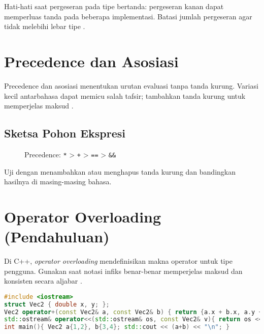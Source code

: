 \documentclass[../main.tex]{subfiles}
\begin{document}
Hati-hati saat pergeseran pada tipe bertanda: pergeseran kanan dapat memperluas tanda pada beberapa implementasi. Batasi jumlah pergeseran agar tidak melebihi lebar tipe \parencite{iso-c-draft-n1570,cpp-reference}.

\section{Precedence dan Asosiasi}
Precedence dan asosiasi menentukan urutan evaluasi tanpa tanda kurung. Variasi kecil antarbahasa dapat memicu salah tafsir; tambahkan tanda kurung untuk memperjelas maksud \parencite{gnu-c-manual,cpp-op-precedence,c-op-precedence}.

\subsection{Sketsa Pohon Ekspresi}
\begin{figure}[h]
  \centering
  \caption{Precedence: \texttt{*} > \texttt{+} > \texttt{==} > \texttt{&&}}
\end{figure}

Uji dengan menambahkan atau menghapus tanda kurung dan bandingkan hasilnya di masing-masing bahasa.

\section{Operator Overloading (Pendahuluan)}
Di C++, \emph{operator overloading} mendefinisikan makna operator untuk tipe pengguna. Gunakan saat notasi infiks benar-benar memperjelas maksud dan konsisten secara aljabar \parencite{cpp-reference,cpp-operator-overloading}.

\begin{lstlisting}[language=C++, caption={Contoh singkat operator+ pada vektor 2D}]
#include <iostream>
struct Vec2 { double x, y; };
Vec2 operator+(const Vec2& a, const Vec2& b) { return {a.x + b.x, a.y + b.y}; }
std::ostream& operator<<(std::ostream& os, const Vec2& v){ return os << '(' << v.x << ',' << v.y << ')'; }
int main(){ Vec2 a{1,2}, b{3,4}; std::cout << (a+b) << "\n"; }
\end{lstlisting}
\end{document}
